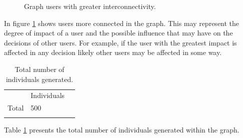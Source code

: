 \begin{figure}
\centering
{} %
\caption{Graph users with greater interconnectivity.}
\label{fig:guserknown_1}   
\end{figure}

In figure \ref{fig:guserknown_1} shows users more connected in the graph. This
may represent the degree of impact of a user and the possible influence that may
have on the decisions of other users. For example, if the user with the greatest
impact is affected in any decision likely other users may be affected in some
way.


\begin{table}
\small
\caption{Total number of individuals generated.}
\label{tab:totalIndividuals_12} 
\centering
\small
\begin{tabular}{p{3cm} p{3cm} p{3cm} }
\hline\noalign{\smallskip}
  & Individuals &  \\
\noalign{\smallskip}\hline\noalign{\smallskip}
\small{Total } & \small{500} & \\ \hline    
\noalign{\smallskip}\hline
\end{tabular}
\end{table}


Table \ref{tab:totalIndividuals_12} presents the total number of individuals generated within the graph.

